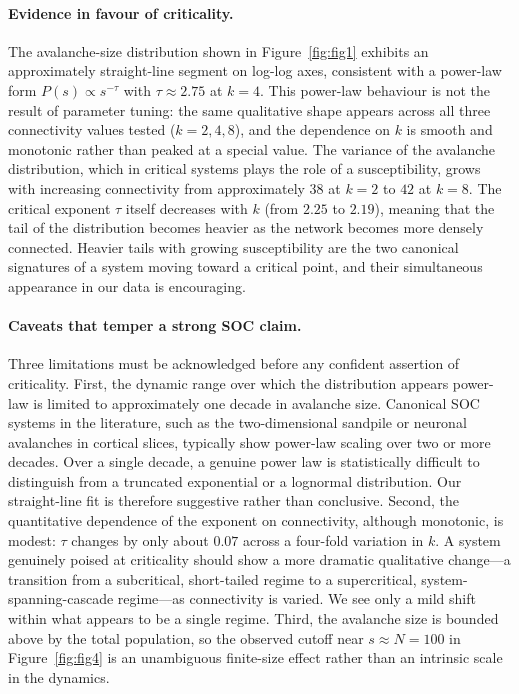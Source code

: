 \documentclass[11pt,a4paper]{article}
\begin{document}
\paragraph{Evidence in favour of criticality.} The avalanche-size
distribution shown in Figure~\ref{fig:fig1} exhibits an approximately
straight-line segment on log-log axes, consistent with a power-law form
$P(s) \propto s^{-\tau}$ with $\tau \approx 2.75$ at $k = 4$. This
power-law behaviour is not the result of parameter tuning: the same
qualitative shape appears across all three connectivity values tested
($k = 2, 4, 8$), and the dependence on $k$ is smooth and monotonic rather
than peaked at a special value. The variance of the avalanche
distribution, which in critical systems plays the role of a
susceptibility, grows with increasing connectivity from approximately
$38$ at $k = 2$ to $42$ at $k = 8$. The critical exponent $\tau$ itself
decreases with $k$ (from $2.25$ to $2.19$), meaning that the tail of the
distribution becomes heavier as the network becomes more densely
connected. Heavier tails with growing susceptibility are the two
canonical signatures of a system moving toward a critical point, and
their simultaneous appearance in our data is encouraging.

\paragraph{Caveats that temper a strong SOC claim.} Three limitations
must be acknowledged before any confident assertion of criticality.
First, the dynamic range over which the distribution appears power-law
is limited to approximately one decade in avalanche size. Canonical SOC
systems in the literature, such as the two-dimensional sandpile or
neuronal avalanches in cortical slices, typically show power-law scaling
over two or more decades. Over a single decade, a genuine power law is
statistically difficult to distinguish from a truncated exponential or a
lognormal distribution. Our straight-line fit is therefore suggestive
rather than conclusive. Second, the quantitative dependence of the
exponent on connectivity, although monotonic, is modest: $\tau$ changes
by only about $0.07$ across a four-fold variation in $k$. A system
genuinely poised at criticality should show a more dramatic qualitative
change---a transition from a subcritical, short-tailed regime to a
supercritical, system-spanning-cascade regime---as connectivity is
varied. We see only a mild shift within what appears to be a single
regime. Third, the avalanche size is bounded above by the total
population, so the observed cutoff near $s \approx N = 100$ in
Figure~\ref{fig:fig4} is an unambiguous finite-size effect rather than an
intrinsic scale in the dynamics.
\end{document}
